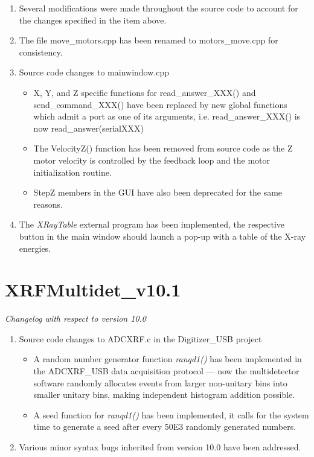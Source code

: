 \documentclass[a4paper,12pt]{article}
\begin{document}
\begin{enumerate}
\begin{itemize}
	\end{itemize}
	\item Several modifications were made throughout the source code to account for the changes specified in the item above.
	\item The file move\_motors.cpp has been renamed to motors\_move.cpp for consistency.
	\item Source code changes to mainwindow.cpp
	\begin{itemize}
		\item X, Y, and Z specific functions for read\_answer\_XXX() and send\_command\_XXX() have been replaced by new global functions which admit a port as one of its arguments, i.e. read\_answer\_XXX() is now read\_answer(serialXXX)
		\item The VelocityZ() function has been removed from source code as the Z motor velocity is controlled by the feedback loop and the motor initialization routine.
		\item StepZ members in the GUI have also been deprecated for the same reasons.
	\end{itemize}
	\item The \textit{XRayTable} external program has been implemented, the respective button in the main window should launch a pop-up with a table of the X-ray energies.
\end{enumerate}

\section{XRFMultidet\_v10.1}
\textit{Changelog with respect to version 10.0}

\begin{enumerate}
	\item Source code changes to ADCXRF.c in the Digitizer\_USB project
	\begin{itemize}
		\item A random number generator function \textit{ranqd1()} has been implemented in the ADCXRF\_USB data acquisition protocol --- now the multidetector software randomly allocates events from larger non-unitary bins into smaller unitary bins, making independent histogram addition possible.
		\item A seed function for \textit{ranqd1()} has been implemented, it calls for the system time to generate a seed after every 50E3 randomly generated numbers.
	\end{itemize}
	\item Various minor syntax bugs inherited from version 10.0 have been addressed.
\end{enumerate}
\end{document}
